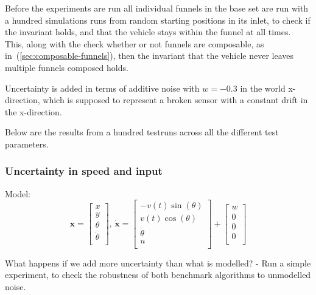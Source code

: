 Before the experiments are run all individual funnels in the base set are run
with a hundred simulations runs from random starting positions in its inlet, to
check if the invariant holds, and that the vehicle stays within the funnel at
all times. This, along with the check whether or not funnels are composable, as
in~(\ref{sec:composable-funnels}), then the invariant that the vehicle never
leaves multiple funnels composed holds.

Uncertainty is added in terms of additive noise with \(w = -0.3\) in the world
x-direction, which is supposed to represent a broken sensor with a constant
drift in the x-direction.

Below are the results from a hundred testruns across all the different test
parameters.

\subsubsection{Uncertainty in speed and input}
Model:
\begin{equation}
  \label{eq:model-dynamics}
  \mathbf{x} =
  \begin{bmatrix}
    x \\ y \\ \theta \\ \dot{\theta} \\
  \end{bmatrix}, \, \dot{\mathbf{x}} =
  \begin{bmatrix}
    -v(t)   \sin(\theta) \\
    v(t) \cos(\theta) \\
    \dot{\theta} \\
    u \\
  \end{bmatrix}
  +
  \begin{bmatrix}
    w \\
    0 \\
    0 \\
    0 \\
  \end{bmatrix}
\end{equation}

What happens if we add more uncertainty than what is modelled? - Run a simple
experiment, to check the robustness of both benchmark algorithms to unmodelled noise.